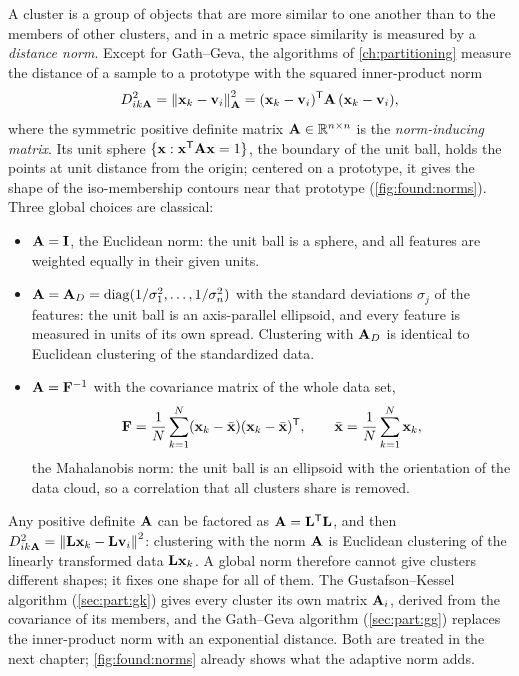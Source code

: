 A cluster is a group of objects that are more similar to one another than to the members of other clusters, and in a metric space similarity is measured by a \emph{distance norm}. Except for Gath--Geva, the algorithms of \cref{ch:partitioning} measure the distance of a sample to a prototype with the squared inner-product norm
\begin{equation}
  D^2_{ik\mathbf{A}}=\left\lVert \mathbf{x}_k-\mathbf{v}_i \right\rVert^2_{\mathbf{A}}=(\mathbf{x}_k-\mathbf{v}_i)^{\mathsf{T}}\mathbf{A}\,(\mathbf{x}_k-\mathbf{v}_i),
  \label{eq:found:norm}
\end{equation}
where the symmetric positive definite matrix $\mathbf{A}\in\mathbb{R}^{n\times n}$ is the \emph{norm-inducing matrix}. Its unit sphere $\{\mathbf{x}: \mathbf{x}^{\mathsf{T}}\mathbf{A}\mathbf{x}=1\}$, the boundary of the unit ball, holds the points at unit distance from the origin; centered on a prototype, it gives the shape of the iso-membership contours near that prototype (\cref{fig:found:norms}). Three global choices are classical:
\begin{itemize}
  \item $\mathbf{A}=\mathbf{I}$, the Euclidean norm: the unit ball is a sphere, and all features are weighted equally in their given units.
  \item $\mathbf{A}=\mathbf{A}_D=\operatorname{diag}(1/\sigma_1^2,\dots,1/\sigma_n^2)$ with the standard deviations $\sigma_j$ of the features: the unit ball is an axis-parallel ellipsoid, and every feature is measured in units of its own spread. Clustering with $\mathbf{A}_D$ is identical to Euclidean clustering of the standardized data.
  \item $\mathbf{A}=\mathbf{F}^{-1}$ with the covariance matrix of the whole data set,
  \begin{equation}
    \mathbf{F}=\frac1N\sum_{k=1}^{N}(\mathbf{x}_k-\bar{\mathbf{x}})(\mathbf{x}_k-\bar{\mathbf{x}})^{\mathsf{T}},\qquad \bar{\mathbf{x}}=\frac1N\sum_{k=1}^N\mathbf{x}_k,
    \label{eq:found:cov}
  \end{equation}
  the Mahalanobis norm: the unit ball is an ellipsoid with the orientation of the data cloud, so a correlation that all clusters share is removed.
\end{itemize}
Any positive definite $\mathbf{A}$ can be factored as $\mathbf{A}=\mathbf{L}^{\mathsf{T}}\mathbf{L}$, and then $D^2_{ik\mathbf{A}}=\left\lVert \mathbf{L}\mathbf{x}_k-\mathbf{L}\mathbf{v}_i \right\rVert^2$: clustering with the norm $\mathbf{A}$ is Euclidean clustering of the linearly transformed data $\mathbf{L}\mathbf{x}_k$. A global norm therefore cannot give clusters different shapes; it fixes one shape for all of them. The Gustafson--Kessel algorithm (\cref{sec:part:gk}) gives every cluster its own matrix $\mathbf{A}_i$, derived from the covariance of its members, and the Gath--Geva algorithm (\cref{sec:part:gg}) replaces the inner-product norm with an exponential distance. Both are treated in the next chapter; \cref{fig:found:norms} already shows what the adaptive norm adds.

